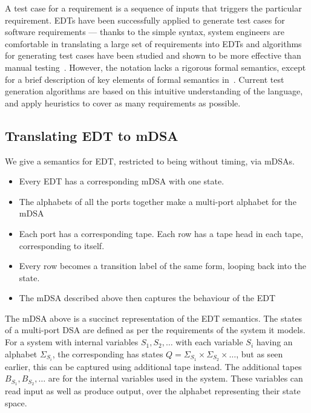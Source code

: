 A test case for a requirement is a sequence of inputs that triggers
the particular requirement. EDTs have been successfully applied to
generate test cases for software requirements --- thanks to the simple
syntax, system engineers are comfortable in translating a large set of
requirements into EDTs and algorithms for generating test cases have
been studied and shown to be more effective than manual
testing~\cite{Venkatesh:ENASE:2015}. However, the notation lacks a
rigorous formal semantics, except for a brief description of key
elements of formal semantics in~\cite{Venkatesh:DATE:2014}. Current
test generation algorithms are based on this intuitive understanding
of the language, and apply heuristics to cover as many requirements as
possible. 

\subsection{Translating EDT to mDSA}

We give a semantics for EDT, restricted to being without timing, via mDSAs. 
\begin{itemize}
\item
Every EDT has a corresponding mDSA with one state.
\item
The alphabets of all the ports together make a multi-port alphabet for the mDSA
\item
Each port has a corresponding tape. Each row has a tape head in each tape, corresponding to itself.
\item
Every row becomes a transition label of the same form, looping back into the state.
\item
The mDSA described above then captures the behaviour of the EDT
\end{itemize}

The mDSA above is a succinct representation of the EDT semantics. The states of a multi-port DSA are defined as per the requirements of the system it models. For a system with internal variables $S_1,S_2,\dots$ with each variable $S_i$ having an alphabet $\Sigma_{S_i}$, the corresponding \mdsa has states $Q=\Sigma_{S_1} \times \Sigma_{S_2} \times \dots$, but as seen earlier, this can be captured using additional tape instead. The additional tapes $B_{S_1}, B_{S_2}, \dots$ are for the internal variables used in the system. These variables can read input as well as produce output, over the alphabet representing their state space. %

